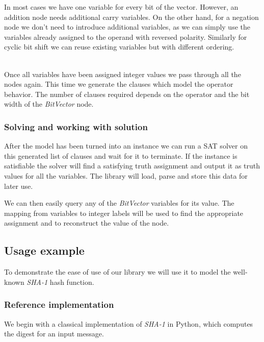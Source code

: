 In most cases we have one variable for every bit of the vector.
However, an addition node needs additional carry variables.
On the other hand, for a negation node we don't need to introduce additional variables, as we can simply use the variables already assigned to the operand with reversed polarity.
Similarly for cyclic bit shift we can reuse existing variables but with different ordering.

~\\

Once all variables have been assigned integer values we pass through all the nodes again.
This time we generate the clauses which model the operator behavior.
The number of clauses required depends on the operator and the bit width of the \emph{BitVector} node.

\subsubsection{Solving and working with solution}
After the model has been turned into an instance we can run a SAT solver on this generated list of clauses and wait for it to terminate.
If the instance is satisfiable the solver will find a satisfying truth assignment and output it as truth values for all the variables.
The library will load, parse and store this data for later use.

We can then easily query any of the \emph{BitVector} variables for its value.
The mapping from variables to integer labels will be used to find the appropriate assignment and to reconstruct the value of the node.

\subsection{Usage example}
To demonstrate the ease of use of our library we will use it to model the well-known \emph{SHA-1} hash function.

\subsubsection{Reference implementation}
We begin with a classical implementation of \emph{SHA-1} in Python, which computes the digest for an input message.
